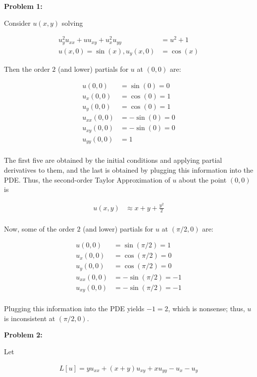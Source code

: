 \documentclass[a4paper,12pt]{article}
\begin{document}
{\bf Problem 1:}

Consider $u(x,y)$ solving

\begin{align*}
u_y^2u_{xx}+uu_{xy}+u_x^2u_{yy} &= u^2+1\\
u(x,0) = \sin(x), u_y(x,0) &= \cos(x)
\end{align*}

Then the order $2$ (and lower) partials for $u$ at $(0,0)$ are:

\begin{align*}
u(0,0) &= \sin(0) = 0\\
u_x(0,0) &= \cos(0) = 1\\
u_y(0,0) &= \cos(0) = 1\\
u_{xx}(0,0) &= -\sin(0) = 0\\
u_{xy}(0,0) &= -\sin(0) = 0\\
u_{yy}(0,0) &= 1\\
\end{align*}

The first five are obtained by the initial conditions and applying partial derivatives to them, and the last is obtained by plugging this information into the PDE. Thus, the second-order Taylor Approximation of $u$ about the point $(0,0)$ is

\begin{align*}
u(x,y) &\approx x+y+\frac{y^2}{2} \\
\end{align*}

Now, some of the order $2$ (and lower) partials for $u$ at $(\pi/2, 0)$ are:

\begin{align*}
u(0,0) &= \sin(\pi/2) = 1\\
u_x(0,0) &= \cos(\pi/2) = 0\\
u_y(0,0) &= \cos(\pi/2) = 0\\
u_{xx}(0,0) &= -\sin(\pi/2) = -1\\
u_{xy}(0,0) &= -\sin(\pi/2) = -1\\
\end{align*}

Plugging this information into the PDE yields $-1=2$, which is nonsense; thus, $u$ is inconsistent at $(\pi/2,0)$.

\shunt

{\bf Problem 2:}

Let

\begin{align*}
L[u] = yu_{xx} + (x+y)u_{xy} + xu_{yy} - u_x - u_y
\end{align*}
\end{document}
